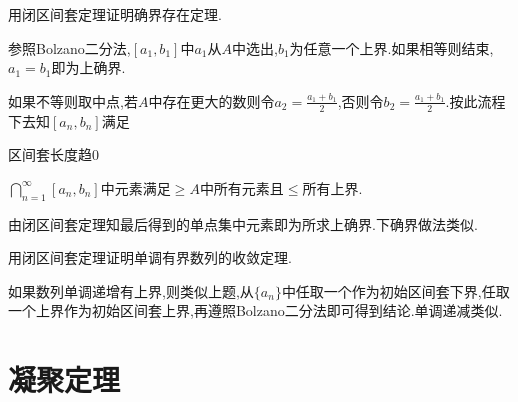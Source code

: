 \documentclass[cn,chinese,fontset]{elegantbook}
\begin{document}
      \begin{exercise}
          用闭区间套定理证明确界存在定理.
      \end{exercise}
      \begin{solution}
          参照Bolzano二分法,$[a_1,b_1]$中$a_1$从$A$中选出,$b_1$为任意一个上界.如果相等则结束,$a_1=b_1$即为上确界.

          如果不等则取中点,若$A$中存在更大的数则令$a_2=\frac{a_1+b_1}{2}$,否则令$b_2=\frac{a_1+b_1}{2}$.按此流程下去知$[a_n,b_n]$满足

          区间套长度趋0

          $\textstyle\bigcap_{n=1}^\infty[a_n,b_n]$中元素满足$\geqslant A$中所有元素且$\leqslant $所有上界.

          由闭区间套定理知最后得到的单点集中元素即为所求上确界.下确界做法类似.
      \end{solution}

      \begin{exercise}
          用闭区间套定理证明单调有界数列的收敛定理.
      \end{exercise}
      \begin{solution}
          如果数列单调递增有上界,则类似上题,从$\{a_n\}$中任取一个作为初始区间套下界,任取一个上界作为初始区间套上界,再遵照Bolzano二分法即可得到结论.单调递减类似.
      \end{solution}
 \section{凝聚定理}
\end{document}
